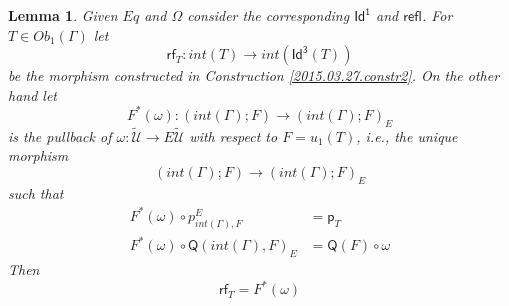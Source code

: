 \documentclass[12pt]{article}
\numberwithin{equation}{section}
\newtheorem{lemma}[proposition]{Lemma}
\newcommand{\llabel}[1]{\label{#1}}
\newcommand{\sr}{\rightarrow}
\newcommand{\wt}{\widetilde}
\newcommand{\p}{\mathsf{p}}
\newcommand{\Id}{\mathsf{Id^1}} %
\newcommand{\Idx}{\mathsf{Id^3}} %
\newcommand{\refl}{\mathsf{refl}}
\newcommand{\U}{\mathcal{U}}
\newcommand{\rf}{\mathsf{rf}}
\newcommand{\Q}{\mathsf{Q}}
\begin{document}
\begin{lemma}
\llabel{2015.03.31.l2} Given $Eq$ and $\Omega$ consider the corresponding $\Id$
and $\refl$. For $T\in Ob_1(\Gamma)$ let %
$$\rf_T:int(T)\sr int(\Idx(T))$$
%
be the morphism constructed in Construction \ref{2015.03.27.constr2}. On the
other hand let
%
$$F^*(\omega):(int(\Gamma);F)\sr (int(\Gamma);F)_{E}$$
%
is the pullback of $\omega:\wt{\U}\sr E\wt{\U}$ with respect to $F=u_1(T)$,
i.e., the unique morphism
%
$$(int(\Gamma);F)\sr (int(\Gamma);F)_{E}$$
%
such that
%
\begin{align*}
  F^*(\omega)\circ p^{E}_{int(\Gamma),F} & = \p_{T} \\
  F^*(\omega)\circ \Q(int(\Gamma),F)_{E} & = \Q(F)\circ \omega
\end{align*}
%
Then
%
$$\rf_T=F^*(\omega)$$
%
\end{lemma}
%
\end{document}

